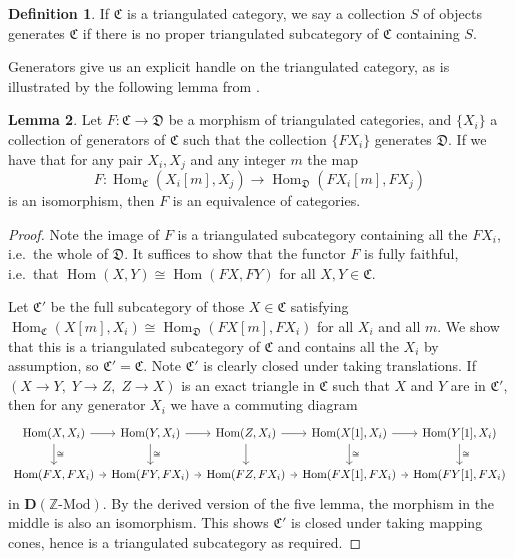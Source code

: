 \documentclass[a4paper]{article}
\theoremstyle{definition}
\newtheorem{defn}{Definition}[section]
\newtheorem{lemma}[defn]{Lemma}
\theoremstyle{remark}
\newcommand{\Mod}{\ensuremath{\text{-Mod}}}
\DeclareMathOperator{\Hom}{\text{Hom}}
\newcommand{\deri}{\mathbf{D}}
\begin{document}
\begin{defn}
    If \(\mathfrak{C}\) is a triangulated category, we say a collection \(S\) of
    objects generates \(\mathfrak{C}\) if there is no proper triangulated
    subcategory of \(\mathfrak{C}\) containing \(S\).
\end{defn}

Generators give us an explicit handle on the triangulated category, as is
illustrated by the following lemma from .

\begin{lemma}\label{beilinson-lemma1}
    Let \(F:\mathfrak{C}\rightarrow \mathfrak{D}\) be a morphism of triangulated
    categories, and \(\{X_i\}\) a collection of generators of \(\mathfrak{C}\)
    such that the collection \(\{FX_i\}\) generates
    \(\mathfrak{D}\). If we have that for any pair \(X_i,X_j\) and any integer
    \(m\) the map
    \[F:\Hom_\mathfrak{C}(X_i[m],X_j)\rightarrow
    \Hom_\mathfrak{D}(FX_i[m],FX_j)\]
    is an isomorphism, then \(F\) is an equivalence of categories.
    \begin{proof}
        Note the image of \(F\) is a triangulated subcategory containing all the
        \(FX_i\), i.e.\ the whole of \(\mathfrak{D}\). It suffices to show that
        the functor \(F\) is fully faithful, i.e.\ that \(\Hom(X,Y)\cong
        \Hom(FX,FY)\) for all \(X,Y\in \mathfrak{C}\). 

        Let \(\mathfrak{C}'\) be the full subcategory of those
        \(X\in \mathfrak{C}\) satisfying \(\Hom_\mathfrak{C}(X[m],X_i)\cong
        \Hom_\mathfrak{D}(FX[m],FX_i)\) for all \(X_i\) and all \(m\). We show
        that this is a triangulated subcategory of \(\mathfrak{C}\) and contains
        all the \(X_i\) by assumption, so \(\mathfrak{C}'=\mathfrak{C}\). Note
        \(\mathfrak{C}'\) is clearly closed under taking translations. If
        \((X\rightarrow Y,\; Y\rightarrow Z, \; Z\rightarrow X)\) is an exact
        triangle in \(\mathfrak{C}\) such that \(X\) and \(Y\) are in
        \(\mathfrak{C}'\), then for any generator \(X_i\) we have a commuting
        diagram 
        \[\begin{tikzcd}[column sep= tiny]
            \Hom(X,X_i) \arrow[r] \arrow[d, "\cong"]
            &\Hom(Y,X_i) \arrow[r] \arrow[d, "\cong"]
            &\Hom(Z,X_i) \arrow[r] \arrow[d]
            &\Hom(X[1],X_i) \arrow[r] \arrow[d, "\cong"]
            &\Hom(Y[1],X_i) \arrow[d, "\cong"] \\
            \Hom(FX,FX_i) \arrow[r] 
            &\Hom(FY,FX_i) \arrow[r] 
            &\Hom(FZ,FX_i) \arrow[r]
            &\Hom(FX[1],FX_i) \arrow[r] 
            &\Hom(FY[1],FX_i) 
        \end{tikzcd}\]
        in \(\deri(\mathbb{Z}\Mod)\). By the derived version of the five lemma,
        the morphism in the middle is also an isomorphism. This shows
        \(\mathfrak{C}'\) is closed under taking mapping cones, hence is a
        triangulated subcategory as required.


\end{proof}
\end{lemma}
\end{document}
